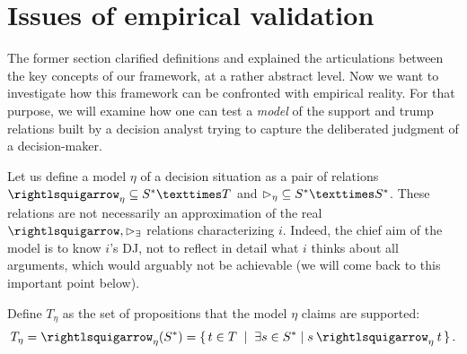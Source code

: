 \documentclass[smallextended,nospthms, natbib]{svjour3}
\begin{document}
\section{Issues of empirical validation}
\label{sec:empirical}
The former section clarified definitions and explained the articulations between the key concepts of our framework, at a rather abstract level. Now we want to investigate how this framework can be confronted with empirical reality. For that purpose, we will examine how one can test a \emph{model} of the support and trump relations built by a decision analyst trying to capture the deliberated judgment of a decision-maker.

Let us define a model $\eta$ of a decision situation as a pair of relations $\mleadsto \subseteq \allargs × T$ and $\mbeats \subseteq \allargs × \allargs$. These relations are not necessarily an approximation of the real $\ileadsto, \ibeatse$ relations characterizing $i$. Indeed, the chief aim of the model is to know $i$’s \ac{DJ}, not to reflect in detail what $i$ thinks about all arguments, which would arguably not be achievable (we will come back to this important point below).

Define $T_\eta$ as the set of propositions that the model $\eta$ claims are supported:
\begin{equation}
	T_\eta = {\mleadsto}(\allargs) = \set{t \in T \suchthat \exists \ar \in \allargs \suchthat \ar \mleadsto t}.
\end{equation}
\end{document}
